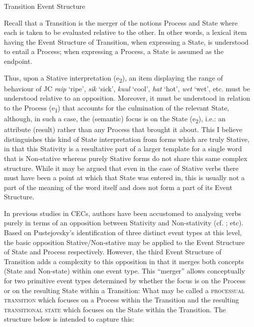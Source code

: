 \ea%
 \label{ex:5:12} 
 Transition Event Structure \citep[56]{Pustejovsky1991}
 \begin{center}
\end{center}
\z 
Recall that a Transition is the merger of the notions Process and State where each is taken to be evaluated relative to the other. In other words, a lexical item having the Event Structure of Transition, when expressing a State, is understood to entail a Process; when expressing a Process, a State is assumed as the endpoint. 

Thus, upon a Stative interpretation (e\textsubscript{2}), an item displaying the range of behaviour of JC \textit{raip} ‘ripe’, \textit{sik} ‘sick’, \textit{kuul} ‘cool’, \textit{hat} ‘hot’, \textit{wet} ‘wet’, etc. must be understood relative to an opposition. Moreover, it must be understood in relation to the Process (e\textsubscript{1}) that accounts for the culmination of the relevant State, although, in such a case, the (semantic) focus is on the State (e\textsubscript{2}), i.e.: an attribute (result) rather than any Process that brought it about. This I believe distinguishes this kind of State interpretation from forms which are truly Stative, in that this Stativity is a resultative part of a larger template for a single word that is Non-stative whereas purely Stative forms do not share this same complex structure. While it may be argued that even in the case of Stative verbs there must have been a point at which that State was entered in, this is usually not a part of the meaning of the word itself and does not form a part of its Event Structure.

In previous studies in CECs, authors have been accustomed to analysing verbs purely in terms of an opposition between Stativity and Non-stativity (cf. \citealt{Bickerton1975,Jaganauth1987,Winford1993,Gooden2008}; etc). Based on Pustejovsky’s identification of three distinct event types at this level, the basic opposition Stative\slash Non-stative may be applied to the Event Structure of State and Process respectively. However, the third Event Structure of Transition adds a complexity to this opposition in that it merges both concepts (State and Non-state) within one event type. This ``merger'' allows conceptually for two primitive event types determined by whether the focus is on the Process or on the resulting State within a Transition: What may be called a \textsc{processual transition} which focuses on a Process within the Transition and the resulting \textsc{transitional state} which focuses on the State within the Transition. The structure below is intended to capture this:

